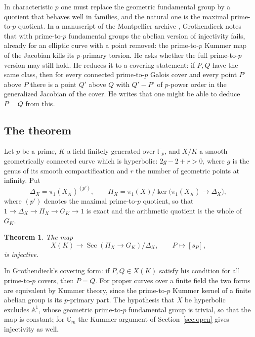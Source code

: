 \documentclass[11pt]{amsart}
\newtheorem{theorem}{Theorem}
\theoremstyle{remark}
\newcommand{\F}{\mathbb F}
\DeclareMathOperator{\Sec}{Sec}
\begin{document}
In characteristic $p$ one must replace the geometric fundamental group by a quotient that behaves well in families, and the natural one is the maximal prime-to-$p$ quotient. In a manuscript of the Montpellier archive \cite[cote 149, ms.~pp.~17--18]{Archive}, Grothendieck notes that with prime-to-$p$ fundamental groups the abelian version of injectivity fails, already for an elliptic curve with a point removed: the prime-to-$p$ Kummer map of the Jacobian kills its $p$-primary torsion. He asks whether the full prime-to-$p$ version may still hold. He reduces it to a covering statement: if $P,Q$ have the same class, then for every connected prime-to-$p$ Galois cover and every point $P'$ above $P$ there is a point $Q'$ above $Q$ with $Q'-P'$ of $p$-power order in the generalized Jacobian of the cover. He writes that one might be able to deduce $P=Q$ from this.

\subsection{The theorem}
Let $p$ be a prime, $K$ a field finitely generated over $\F_p$, and $X/K$ a smooth geometrically connected curve which is hyperbolic: $2g-2+r>0$, where $g$ is the genus of its smooth compactification and $r$ the number of geometric points at infinity. Put
\[
 \Delta_X=\pi_1(X_{\overline K})^{(p')},\qquad
 \Pi_X=\pi_1(X)\big/\ker\bigl(\pi_1(X_{\overline K})\to\Delta_X\bigr),
\]
where $(p')$ denotes the maximal prime-to-$p$ quotient, so that $1\to\Delta_X\to\Pi_X\to G_K\to1$ is exact and the arithmetic quotient is the whole of $G_K$.

\begin{theorem}\label{thm:main}
The map
\[
 X(K)\longrightarrow \Sec(\Pi_X\to G_K)/\Delta_X,\qquad P\longmapsto[s_P],
\]
is injective.
\end{theorem}

In Grothendieck's covering form: if $P,Q\in X(K)$ satisfy his condition for all prime-to-$p$ covers, then $P=Q$. For proper curves over a finite field the two forms are equivalent by Kummer theory, since the prime-to-$p$ Kummer kernel of a finite abelian group is its $p$-primary part. The hypothesis that $X$ be hyperbolic excludes $\mathbb A^1$, whose geometric prime-to-$p$ fundamental group is trivial, so that the map is constant; for $\mathbb G_m$ the Kummer argument of Section~\ref{sec:open} gives injectivity as well.
\end{document}
